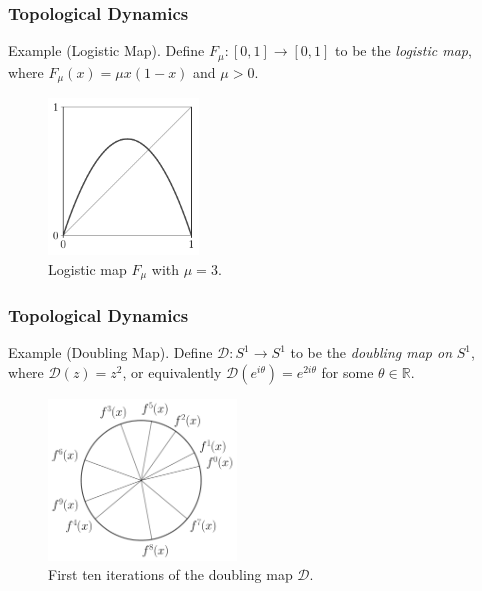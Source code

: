 \documentclass{beamer}
\begin{document}
\begin{frame}
    \frametitle{Topological Dynamics}

    \begin{block}{Example (Logistic Map).}
        Define $F_{\mu}: [0, 1] \to [0, 1]$ to be the \emph{logistic map}, where $F_{\mu}(x)=\mu x(1-x)$ and $\mu > 0$.
        
        \begin{figure}[h]
            \centering
            \includegraphics[width=4cm]{../images/logistic_3}
            \caption{Logistic map $F_\mu$ with $\mu = 3$.}
            \label{fig:logistic_3}
        \end{figure}

    \end{block}
\end{frame}

\begin{frame}
    \frametitle{Topological Dynamics}

    \begin{block}{Example (Doubling Map).}
        Define $\mathcal{D}: S^1 \to S^1$ to be the \emph{doubling map on} $S^1$, where $\mathcal{D}(z) = z^2$, or equivalently $\mathcal{D}(e^{i\theta}) = e^{2i\theta}$ for some $\theta \in \mathbb{R}$.

        \begin{figure}[h]
            \centering
            \includegraphics[width=5cm]{../images/doubling_circle}
            \caption{First ten iterations of the doubling map $\mathcal{D}$.}
            \label{fig:doubling-circle}
        \end{figure}
    \end{block}
\end{frame}
\end{document}

